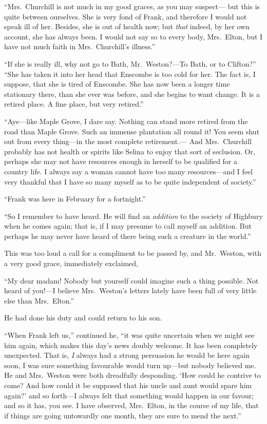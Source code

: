 ``Mrs.\ Churchill is not much in my good graces, as you may suspect---%
but this is quite between ourselves.  She is very fond of Frank,
and therefore I would not speak ill of her.  Besides, she is out of
health now; but \emph{that} indeed, by her own account, she has always been.
I would not say so to every body, Mrs.\ Elton, but I have not much
faith in Mrs.\ Churchill's illness.''

``If she is really ill, why not go to Bath, Mr.\ Weston?---To Bath,
or to Clifton?''  ``She has taken it into her head that Enscombe is too
cold for her.  The fact is, I suppose, that she is tired of Enscombe.
She has now been a longer time stationary there, than she ever
was before, and she begins to want change.  It is a retired place.
A fine place, but very retired.''

``Aye---like Maple Grove, I dare say.  Nothing can stand more retired from
the road than Maple Grove.  Such an immense plantation all round it!
You seem shut out from every thing---in the most complete retirement.---%
And Mrs.\ Churchill probably has not health or spirits like Selina
to enjoy that sort of seclusion.  Or, perhaps she may not have
resources enough in herself to be qualified for a country life.
I always say a woman cannot have too many resources---and I feel
very thankful that I have so many myself as to be quite independent
of society.''

``Frank was here in February for a fortnight.''

``So I remember to have heard.  He will find an \emph{addition} to the
society of Highbury when he comes again; that is, if I may presume
to call myself an addition.  But perhaps he may never have heard
of there being such a creature in the world.''

This was too loud a call for a compliment to be passed by,
and Mr.\ Weston, with a very good grace, immediately exclaimed,

``My dear madam!  Nobody but yourself could imagine such a
thing possible.  Not heard of you!---I believe Mrs.\ Weston's
letters lately have been full of very little else than Mrs.\ Elton.''

He had done his duty and could return to his son.

``When Frank left us,'' continued he, ``it was quite uncertain when we
might see him again, which makes this day's news doubly welcome.
It has been completely unexpected.  That is, \emph{I} always had a strong
persuasion he would be here again soon, I was sure something
favourable would turn up---but nobody believed me.  He and Mrs.\ Weston
were both dreadfully desponding.  `How could he contrive to come?
And how could it be supposed that his uncle and aunt would spare
him again?' and so forth---I always felt that something would happen
in our favour; and so it has, you see.  I have observed, Mrs.\ Elton,
in the course of my life, that if things are going untowardly one month,
they are sure to mend the next.''

